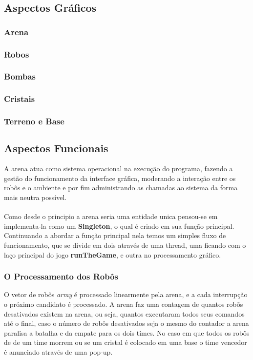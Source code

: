 \documentclass[a4paper]{article}
\begin{document}
\subsection{Aspectos Gráficos}

\subsubsection{Arena}
\subsubsection{Robos}
\subsubsection{Bombas}
\subsubsection{Cristais}
\subsubsection{Terreno e Base}

\subsection{Aspectos Funcionais}
A arena atua como sistema operacional na execução do programa, fazendo a gestão do funcionamento da interface gráfica, moderando a interação entre os robôs e o ambiente e por fim administrando as chamadas ao sistema da forma mais neutra possível.\\\\ 
Como desde o principio a arena seria uma entidade unica pensou-se em implementa-la como um \textbf{Singleton}, o qual é criado em sua função principal. Continuando a abordar a função principal nela temos um simples fluxo de funcionamento, que se divide em dois através de uma thread, uma ficando com o laço principal do jogo  \textbf{runTheGame}, e outra no processamento gráfico.

\subsubsection{O Processamento dos Robôs}
O vetor de robôs \textit{army} é processado linearmente pela arena, e a cada interrupção o próximo candidato é processado. A arena faz uma contagem de quantos robõs desativados existem na arena, ou seja, quantos executaram todos seus comandos até o final, caso o número de robôs desativados seja o mesmo do contador a arena paralisa a batalha e da empate para os dois times. No caso em que todos os robôs de de um time morrem ou se um cristal é colocado em uma base o time vencedor é anunciado através de uma pop-up.
\end{document}
